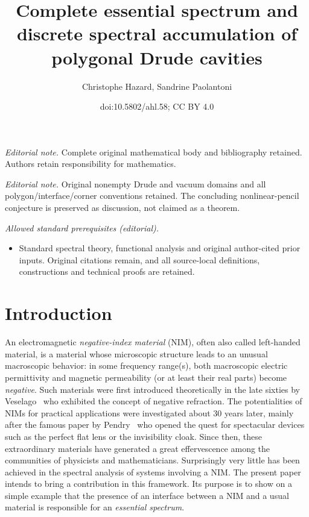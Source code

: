 \documentclass[10pt]{amsart}
\title{Complete essential spectrum and discrete spectral accumulation of polygonal Drude cavities}
\author{Christophe Hazard, Sandrine Paolantoni}
\date{doi:10.5802/ahl.58; CC BY 4.0}
\theoremstyle{definition}
\begin{document}
\maketitle
\noindent\textit{Editorial note.} Complete original mathematical body and bibliography retained. Authors retain responsibility for mathematics.\par\medskip
\noindent\textit{Editorial note.} Original nonempty Drude and vacuum domains and all polygon/interface/corner conventions retained. The concluding nonlinear-pencil conjecture is preserved as discussion, not claimed as a theorem.\par\medskip
\noindent\textit{Allowed standard prerequisites (editorial).}\begin{itemize}
\item Standard spectral theory, functional analysis and original author-cited prior inputs. Original citations remain, and all source-local definitions, constructions and technical proofs are retained.
\end{itemize}\medskip
\section{Introduction}\label{s-intro}
An electromagnetic \emph{negative-index material} (NIM), often also called left-handed material, is a material whose microscopic structure leads to an unusual macroscopic behavior: in some frequency range(s), both macroscopic electric permittivity and magnetic permeability (or at least their real parts) become \emph{negative}. Such materials were first introduced theoretically in the late sixties by Veselago~\cite{Ves-68} who exhibited the concept of negative refraction. The potentialities of NIMs for practical applications were investigated about 30 years later, mainly after the famous paper by Pendry~\cite{Pen-00} who opened the quest for spectacular devices such as the perfect flat lens or the invisibility cloak. Since then, these extraordinary materials have generated a great effervescence among the communities of physicists and mathematicians. Surprisingly very little has been achieved in the spectral analysis of systems involving a NIM. The present paper intends to bring a contribution in this framework. Its purpose is to show on a simple example that the presence of an interface between a NIM and a usual material is responsible for an \emph{essential spectrum}.
\end{document}

